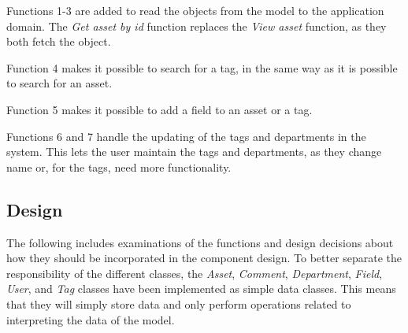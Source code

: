 Functions 1-3 are added to read the objects from the model to the application domain. The \textit{Get asset by id} function replaces the \textit{View asset} function, as they both fetch the object.
\par
Function 4 makes it possible to search for a tag, in the same way as it is possible to search for an asset.
\par
Function 5 makes it possible to add a field to an asset or a tag.
\par
Functions 6 and 7 handle the updating of the tags and departments in the system. This lets the user maintain the tags and departments, as they change name or, for the tags, need more functionality.

\subsection{Design}
The following includes examinations of the functions and design decisions about how they should be incorporated in the component design. To better separate the responsibility of the different classes, the \textit{Asset}, \textit{Comment}, \textit{Department}, \textit{Field}, \textit{User}, and \textit{Tag} classes have been implemented as simple data classes. This means that they will simply store data and only perform operations related to interpreting the data of the model.

